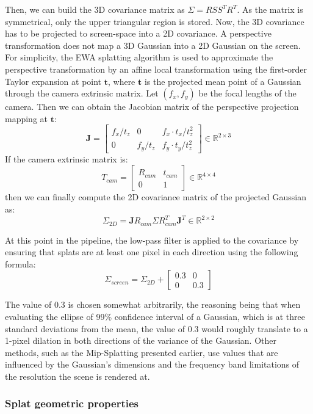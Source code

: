 Then, we can build the 3D covariance matrix as $\Sigma = R S S^T R^T$. As the matrix is symmetrical, only the upper triangular region is stored. Now, the 3D covariance has to be projected to screen-space into a 2D covariance. A perspective transformation does not map a 3D Gaussian into a 2D Gaussian on the screen. For simplicity, the EWA splatting algorithm \cite{ewa_splatting} is used to approximate the perspective transformation by an affine local transformation using the first-order Taylor expansion at point $\bm{t}$, where $\bm{t}$ is the projected mean point of a Gaussian through the camera extrinsic matrix. Let $(f_x, f_y)$ be the focal lengths of the camera. Then we can obtain the Jacobian matrix of the perspective projection mapping at $\bm{t}$:
\[
\bm{J} = \begin{bmatrix}
f_x/t_z & 0 & f_x \cdot t_x / t_z^2\\
0 & f_y/t_z & f_y \cdot t_y / t_z^2
\end{bmatrix} \in \mathbb{R}^{2 \times 3}
\]
If the camera extrinsic matrix is:
\[
T_{cam} = \begin{bmatrix}
R_{cam} & t_{cam}\\
0 & 1
\end{bmatrix} \in \mathbb{R}^{4 \times 4}
\]
then we can finally compute the 2D covariance matrix of the projected Gaussian as:
\[
\Sigma_{2D} = \bm{J} R_{cam} \Sigma R_{cam}^T \bm{J}^T \in \mathbb{R}^{2 \times 2}
\]

At this point in the pipeline, the low-pass filter is applied to the covariance by ensuring that splats are at least one pixel in each direction using the following formula:
\[
\Sigma_{screen} = \Sigma_{2D} + \begin{bmatrix}
0.3 & 0\\
0 & 0.3
\end{bmatrix}
\]

The value of 0.3 is chosen somewhat arbitrarily, the reasoning being that when evaluating the ellipse of 99\% confidence interval of a Gaussian, which is at three standard deviations from the mean, the value of 0.3 would roughly translate to a 1-pixel dilation in both directions of the variance of the Gaussian. Other methods, such as the Mip-Splatting presented earlier, use values that are influenced by the Gaussian's dimensions and the frequency band limitations of the resolution the scene is rendered at.

\subsubsection{Splat geometric properties}

